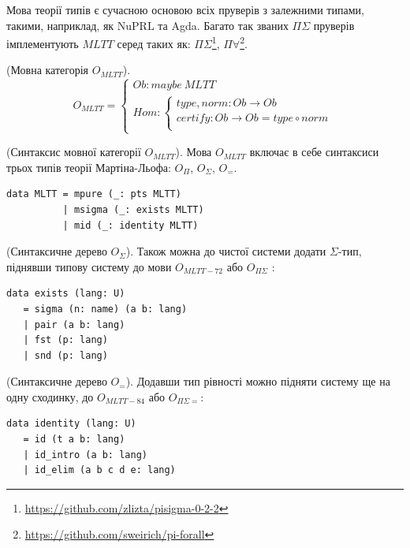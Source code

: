 \begin{definition}
Мова теорії типів є сучасною основою всіх пруверів з залежними типами,
такими, наприклад, як NuPRL та Agda. Багато так званих $\Pi\Sigma$ пруверів
імплементують $MLTT$ серед таких як:
$\Pi\Sigma$\footnote{\url{https://github.com/zlizta/pisigma-0-2-2}},
$\Pi\forall$\footnote{\url{https://github.com/sweirich/pi-forall}}.

\begin{definition} (Мовна категорія $O_{MLTT}$).
$$
O_{MLTT} =
\begin{cases}
Ob: maybe\ MLTT \\
Hom: \begin{cases}
type,norm: Ob \rightarrow Ob \\
certify: Ob \rightarrow Ob = type \circ norm \\
\end{cases}
\end{cases}
$$
\end{definition}

\begin{definition} (Синтаксис мовної категорії $O_{MLTT}$).
Мова $O_{MLTT}$ включає в себе синтаксиси трьох типів
теорії Мартіна-Льофа: $O_\Pi$, $O_\Sigma$, $O_=$.
\begin{lstlisting}
data MLTT = mpure (_: pts MLTT)
          | msigma (_: exists MLTT)
          | mid (_: identity MLTT)
\end{lstlisting}
\end{definition}

\begin{definition} (Синтаксичне дерево $O_\Sigma$).
Також можна до чистої системи додати $\Sigma$-тип,
піднявши типову систему до мови $O_{MLTT-72}$ або $O_{\Pi\Sigma}$ :
\begin{lstlisting}[mathescape=true]
data exists (lang: U)
   = sigma (n: name) (a b: lang)
   | pair (a b: lang)
   | fst (p: lang)
   | snd (p: lang)
\end{lstlisting}
\end{definition}

\begin{definition} (Синтаксичне дерево $O_=$).
Додавши тип рівності можно підняти систему ще на одну сходинку,
до $O_{MLTT-84}$ або $O_{\Pi\Sigma=}$:
\begin{lstlisting}[mathescape=true]
data identity (lang: U)
   = id (t a b: lang)
   | id_intro (a b: lang)
   | id_elim (a b c d e: lang)
\end{lstlisting}
\end{definition}


\end{definition}
